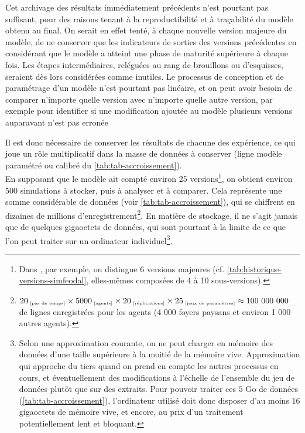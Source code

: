 Cet archivage des résultats immédiatement précédents n'est pourtant pas suffisant, pour des raisons tenant à la reproductibilité et à traçabilité du modèle obtenu au final.
On serait en effet tenté, à chaque nouvelle version \og majeure\fg{} du modèle, de ne conserver que les indicateurs de sorties des versions précédentes en considérant que le modèle a atteint une phase de maturité supérieure à chaque fois.
Les étapes intermédiaires, reléguées au rang de brouillons ou d'esquisses, seraient dès lors considérées comme inutiles.
Le processus de conception et de paramétrage d'un modèle n'est pourtant pas linéaire, et on peut avoir besoin de comparer n'importe quelle version avec n'importe quelle autre version, par exemple pour identifier si une modification ajoutée au modèle plusieurs versions auparavant n'est pas erronée


Il est donc nécessaire de conserver les résultats de chacune des expérience, ce qui joue un rôle multiplicatif dans la masse de données à conserver (ligne \og modèle paramétré ou calibré\fg{} du \cref{tab:tab-accroissement}).\\
En supposant que le modèle ait compté environ 25 versions\footnote{
	Dans \simfeodal{}, par exemple, on distingue 6 versions \og majeures\fg{} (cf. \cref{tab:historique-versions-simfeodal}, elles-mêmes composées de 4 à 10 sous-versions).
}, on obtient environ 500 simulations à stocker, puis à analyser et à comparer.
Cela représente une somme considérable de données (voir \cref{tab:tab-accroissement}), qui se chiffrent en dizaines de millions d'enregistrement\footnote{
	$20_{\text{\tiny ~[pas de temps]}} \times 5000_{\text{\tiny ~[agents]}} \times 20_{\text{\tiny ~[réplications]}} \times 25_{\text{\tiny ~[jeux de paramètres]}} \approx 100~000~000$ de lignes enregistrées pour les agents (4 000 foyers paysans et environ 1 000 autres agents).
}.
En matière de stockage, il ne s'agit jamais que de quelques gigaoctets de données, qui sont pourtant à la limite de ce que l'on peut traiter sur un ordinateur individuel\footnote{
	Selon une approximation courante, on ne peut charger en mémoire des données d'une taille supérieure à la moitié de la mémoire vive.
	Approximation qui approche du tiers quand on prend en compte les autres processus en cours, et éventuellement des modifications à l'échelle de l'ensemble du jeu de données plutôt que sur des extraits.
	Pour pouvoir traiter ces $5$ Go de données (\cref{tab:tab-accroissement}), l'ordinateur utilisé doit donc disposer d'au moins $16$ gigaoctets de mémoire vive, et encore, au prix d'un traitement potentiellement lent et bloquant.
}.

